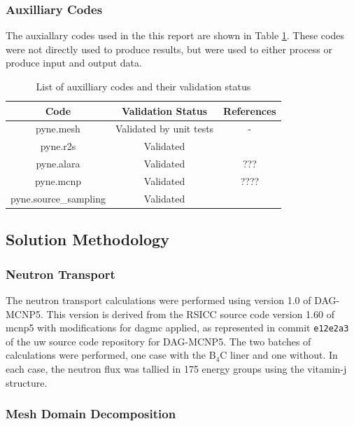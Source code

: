 \documentclass[12pt]{article}
\begin{document}
\subsubsection*{Auxilliary Codes}
The auxiallary codes used in the this report are shown in Table 
\ref{table:validation_aux}. These codes were not directly used to 
produce results, but were used to either process or produce input
and output data.
\begin{centering}
 \begin{table}[ht!]
  \begin{tabular}{c | c | c}
  \hline
  Code & Validation Status & References \\    
  \hline
  pyne.mesh & Validated by unit tests & - \\
  pyne.r2s & Validated & \cite{pyne_r2s} \\
  pyne.alara & Validated & ??? \\
  pyne.mcnp & Validated & ???? \\
  pyne.source\_sampling & Validated & \cite{pyne_r2s} \\
 \end{tabular}
 \caption{List of auxilliary codes and their validation status}
 \label{table:validation_aux}
 \end{table}
\end{centering}

\newpage
\subsection{Solution Methodology}
\label{section:method}

\subsubsection{Neutron Transport}
The neutron transport calculations were performed using version 1.0 of DAG-MCNP5.
This version is derived from the RSICC source code version 1.60 of \gls{mcnp5}
with modifications for \gls{dagmc} applied, as represented in commit \texttt{e12e2a3}
of the \gls{uw} source code repository for DAG-MCNP5.
The two batches of calculations were performed, one
case with the B$_4$C liner and one without.  
In each case, the neutron flux was tallied in 175 energy groups using the
vitamin-j structure.

\subsubsection{Mesh Domain Decomposition}
\end{document}
